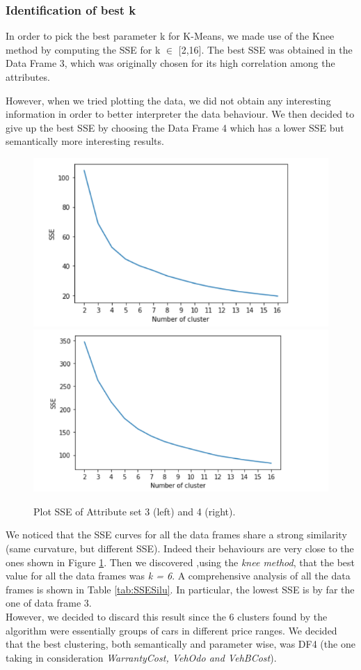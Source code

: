 \documentclass{article}
\begin{document}
	
	\subsubsection{Identification of best k}
	
	
	In order to pick the best parameter k for K-Means, we made use of the Knee method by computing the SSE for k $\in$ [2,16]. The best SSE was obtained in the Data Frame 3, which was originally chosen for its high correlation among the attributes.
	
	However, when we tried plotting the data, we did not obtain any interesting information in order to better interpreter the data behaviour. We then decided to give up the best SSE by choosing the Data Frame 4 which has a lower SSE but semantically more interesting results.
	
	
	\begin{figure}[H]
		\centering
		\includegraphics[width=.49\textwidth]{cattura}\hfill
		\includegraphics[width=.49\textwidth]{SSE2}
		\caption{Plot SSE of Attribute set 3 (left) and 4 (right).}
		\label{fig:KmeansSSE}
	\end{figure}
	We noticed that the SSE curves for all the data frames share a strong similarity (same curvature, but different SSE). Indeed their behaviours are very close to the ones shown in Figure \ref{fig:KmeansSSE}.
	Then we discovered ,using the \emph{knee method}, that the best value for all the data frames was \emph{k = 6}. A comprehensive analysis of all the data frames is shown in Table \ref{tab:SSESilu}. In particular, the lowest SSE is by far the one of data frame 3.\\
	However, we decided to discard this result since the 6 clusters found by the algorithm were essentially groups of cars in different price ranges. We decided that the best clustering, both semantically and parameter wise, was DF4 (the one taking in consideration \emph{WarrantyCost, VehOdo and VehBCost}).
	
\end{document}
